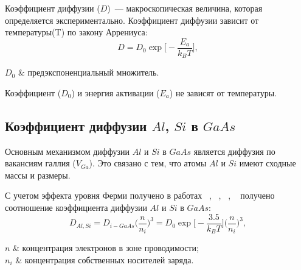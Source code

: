 Коэффициент диффузии ($D$)~--- макроскопическая величина, которая определяется экспериментально. Коэффициент диффузии зависит от температуры(T) по закону Аррениуса:
\begin{equation}
	D = D_{0}\exp\bigg[-\frac{E_{a}}{k_{B}T}\bigg],
\end{equation}
\begin{conditions}
	$D_{0}$ & предэкспоненциальный множитель.
\end{conditions}

Коэффициент ($D_{0}$) и энергия активации ($E_{a}$) не зависят от температуры.

\subsection{Коэффициент диффузии $Al$, $Si$ в $GaAs$}
Основным механизмом диффузии $Al$ и $Si$ в $GaAs$ является диффузия по вакансиям галлия ($V_{Ga}$). Это связано с тем, что атомы $Al$ и $Si$ имеют сходные массы и размеры. 

С учетом эффекта уровня Ферми получено в работах ~\cite{getMeshkov}, ~\cite{Meshkov}, ~\cite{Meshkov}, ~\cite{Makeev} получено соотношение коэффициента диффузии $Al$ и $Si$ в $GaAs$:
\begin{equation}
	D_{Al,Si} = D_{i-GaAs}\Big( \frac{n}{n_{i}} \Big)^{3} = D_{0}\exp\bigg[-\frac{3.5}{k_{B}T}\bigg]\Big( \frac{n}{n_{i}} \Big)^{3},
\end{equation}
\begin{conditions}
	$n$ & концентрация электронов в зоне проводимости;\\
	$n_{i}$ & концентрация собственных носителей заряда.
\end{conditions}